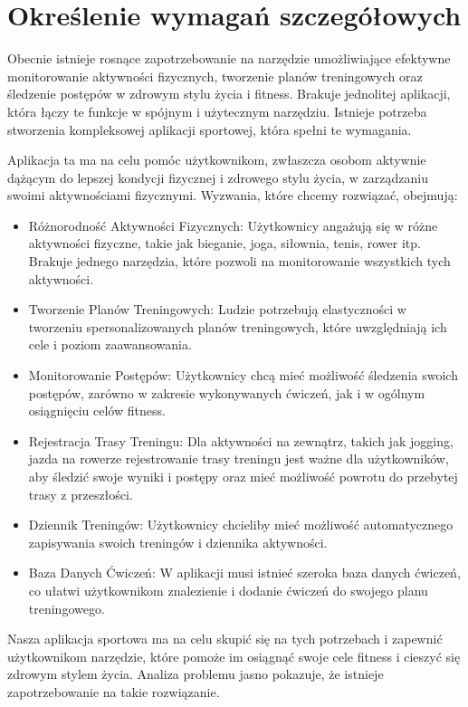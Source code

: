 \newpage
\section{Określenie wymagań szczegółowych}		%

Obecnie istnieje rosnące zapotrzebowanie na narzędzie umożliwiające efektywne monitorowanie aktywności fizycznych, tworzenie planów treningowych oraz śledzenie postępów w zdrowym stylu życia i fitness. Brakuje jednolitej aplikacji, która łączy te funkcje w spójnym i użytecznym narzędziu. Istnieje potrzeba stworzenia kompleksowej aplikacji sportowej, która spełni te wymagania.

Aplikacja ta ma na celu pomóc użytkownikom, zwłaszcza osobom aktywnie dążącym do lepszej kondycji fizycznej i zdrowego stylu życia, w zarządzaniu swoimi aktywnościami fizycznymi. Wyzwania, które chcemy rozwiązać, obejmują:

\begin{itemize}
    \item Różnorodność Aktywności Fizycznych: Użytkownicy angażują się w różne aktywności fizyczne, takie jak bieganie, joga, siłownia, tenis, rower itp. Brakuje jednego narzędzia, które pozwoli na monitorowanie wszystkich tych aktywności.

    \item Tworzenie Planów Treningowych: Ludzie potrzebują elastyczności w tworzeniu spersonalizowanych planów treningowych, które uwzględniają ich cele i poziom zaawansowania.

    \item Monitorowanie Postępów: Użytkownicy chcą mieć możliwość śledzenia swoich postępów, zarówno w zakresie wykonywanych ćwiczeń, jak i w ogólnym osiągnięciu celów fitness.

    \item Rejestracja Trasy Treningu: Dla aktywności na zewnątrz, takich jak jogging, jazda na rowerze rejestrowanie trasy treningu jest ważne dla użytkowników, aby śledzić swoje wyniki i postępy oraz mieć możliwość powrotu do przebytej trasy z przeszłości.

    \item Dziennik Treningów: Użytkownicy chcieliby mieć możliwość automatycznego zapisywania swoich treningów i dziennika aktywności.

    \item Baza Danych Ćwiczeń: W aplikacji musi istnieć szeroka baza danych ćwiczeń, co ułatwi użytkownikom znalezienie i dodanie ćwiczeń do swojego planu treningowego.
\end{itemize}

Nasza aplikacja sportowa ma na celu skupić się na tych potrzebach i zapewnić użytkownikom narzędzie, które pomoże im osiągnąć swoje cele fitness i cieszyć się zdrowym stylem życia. Analiza problemu jasno pokazuje, że istnieje zapotrzebowanie na takie rozwiązanie.



